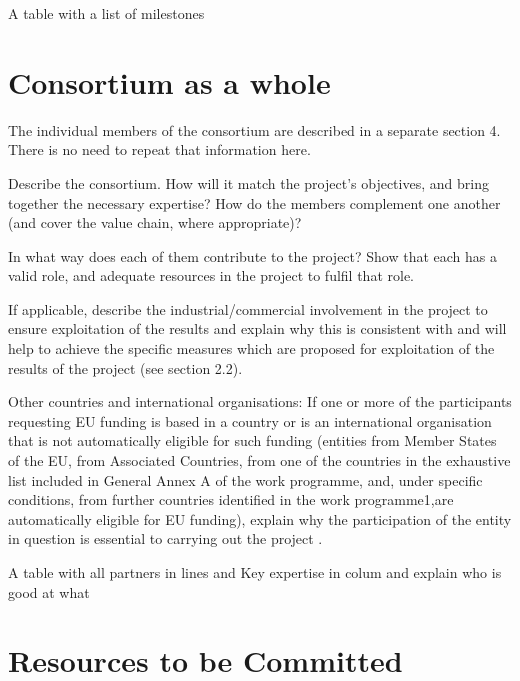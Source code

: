 {\color{red} A table with a list of milestones}



\section{Consortium as a whole}\label{sec:consortium}


\begin{todo}{}\color{red}

  The individual members of the consortium are described in a separate
  section 4. There is no need to repeat that information here.

  Describe the consortium. How will it match the project’s objectives, and bring together the necessary expertise? How do the members complement one another (and cover the value chain, where appropriate)? 

  In what way does each of them contribute to the project? Show that each has a valid role, and adequate resources in the project to fulfil that role. 

  If applicable, describe the industrial/commercial involvement in the project to ensure exploitation of the results and explain why this is consistent with and will help to achieve the specific measures which are proposed for exploitation of the results of the project (see section 2.2). 

  Other countries and international organisations: If one or more of the participants requesting EU funding is based in a country or is an international organisation that is not automatically eligible for such funding (entities from Member States of the EU, from Associated Countries, from one of the countries in the exhaustive list included in General Annex A of the work programme, and, under specific conditions, from further countries identified in the work programme1,are automatically eligible for EU funding), explain why the participation of the entity in question is essential to carrying out the project .
\end{todo}



{\color{red} A table with all partners in lines and Key expertise in colum
  and explain who is good at what}


\section{Resources to be Committed}\label{sec:resources}

